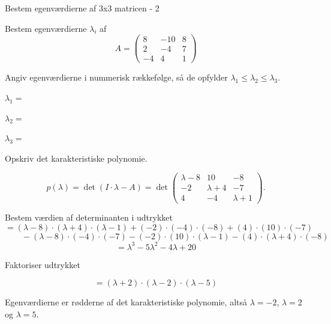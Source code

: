\documentclass{article}
\begin{document}
\begin{exercise}{Bestem egenværdierne af 3x3 matricen - 2}

Bestem egenværdierne $\lambda_i$ af
\[
A=\begin{pmatrix}
8 & -10 & 8 \\
2 & -4 & 7 \\
-4 & 4 & 1
\end{pmatrix}
\]

Angiv egenværdierne i nummerisk rækkefølge, så de
opfylder $\lambda_1 \le \lambda_2 \le \lambda_3$.

$\lambda_1 = $ 

$\lambda_2 = $ 

$\lambda_3 = $ 

\hint
Opskriv det karakteristiske polynomie.

\hint
\[
p(\lambda)=\det\left(I \cdot \lambda - A \right)=\det\begin{pmatrix}
\lambda - 8 & 10 & -8 \\
-2 & \lambda + 4 & -7 \\
4 & -4 & \lambda + 1
\end{pmatrix}.
\]

\hint
Bestem værdien af determinanten i udtrykket
\[
=(\lambda -8) \cdot (\lambda +4) \cdot (\lambda -1)+(-2) \cdot (-4) \cdot (-8)+(4) \cdot (10) \cdot (-7)
\]
\[
\qquad -(\lambda -8) \cdot (-4) \cdot (-7)-(-2) \cdot (10) \cdot (\lambda -1)-(4) \cdot (\lambda +4) \cdot (-8)
\]
\[
= \lambda ^3 - 5\lambda ^2 - 4\lambda +20
\]

\hint
Faktoriser udtrykket

\hint
\[
=(\lambda +2) \cdot (\lambda -2) \cdot (\lambda -5)
\]

\hint
Egenværdierne er rødderne af det karakteristiske polynomie,
altså
$\lambda=-2$, $\lambda=2$ og $\lambda=5$.

\end{exercise}
\end{document}
